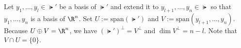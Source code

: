 \documentclass[12pt]{amsart}
\begin{document}
\begin{problem}

    \begin{subproblem}
      Let $y_1,\dots ,y_l\in \lat'$ be a basis of $\lat'$ and extend it to
      $y_{l+1},\dots ,y_n\in \lat$ so that $y_1,\dots ,y_n$ is a basis of $\R^n$.
      Set $U:=\mathrm{span}(\lat')$ and $V:=\mathrm{span}(y_{l+1},\dots ,y_n)$.
      Because $U\oplus V=\R^n$, we have $(\lat')^\perp=V^\perp$ and
      $\dim V^\perp=n-l$. Note that $V\cap U=\{0\}$.
      

\end{subproblem}
\end{problem}
\end{document}
